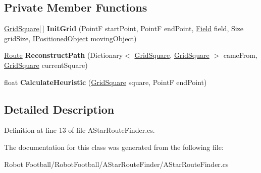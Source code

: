 \subsection*{Private Member Functions}
\begin{DoxyCompactItemize}
\item 
\hypertarget{class_route_finders_1_1_a_star_route_finder_ad59fca6cc3c1f605a39b85c62704897e}{\hyperlink{class_route_finders_1_1_grid_square}{Grid\-Square}\mbox{[}$\,$\mbox{]} {\bfseries Init\-Grid} (Point\-F start\-Point, Point\-F end\-Point, \hyperlink{class_robot_football_core_1_1_objects_1_1_field}{Field} field, Size grid\-Size, \hyperlink{interface_robot_football_core_1_1_interfaces_1_1_i_positioned_object}{I\-Positioned\-Object} moving\-Object)}\label{class_route_finders_1_1_a_star_route_finder_ad59fca6cc3c1f605a39b85c62704897e}

\item 
\hypertarget{class_route_finders_1_1_a_star_route_finder_a55b412f39ab3ba030fd1495dd04105ef}{\hyperlink{class_robot_football_core_1_1_route_objects_1_1_route}{Route} {\bfseries Reconstruct\-Path} (Dictionary$<$ \hyperlink{class_route_finders_1_1_grid_square}{Grid\-Square}, \hyperlink{class_route_finders_1_1_grid_square}{Grid\-Square} $>$ came\-From, \hyperlink{class_route_finders_1_1_grid_square}{Grid\-Square} current\-Square)}\label{class_route_finders_1_1_a_star_route_finder_a55b412f39ab3ba030fd1495dd04105ef}

\item 
\hypertarget{class_route_finders_1_1_a_star_route_finder_a5a5145aebf0bdfac092c4f26957bbae6}{float {\bfseries Calculate\-Heuristic} (\hyperlink{class_route_finders_1_1_grid_square}{Grid\-Square} square, Point\-F end\-Point)}\label{class_route_finders_1_1_a_star_route_finder_a5a5145aebf0bdfac092c4f26957bbae6}

\end{DoxyCompactItemize}


\subsection{Detailed Description}


Definition at line 13 of file A\-Star\-Route\-Finder.\-cs.



The documentation for this class was generated from the following file\-:\begin{DoxyCompactItemize}
\item 
Robot Football/\-Robot\-Football/\-A\-Star\-Route\-Finder/A\-Star\-Route\-Finder.\-cs\end{DoxyCompactItemize}
